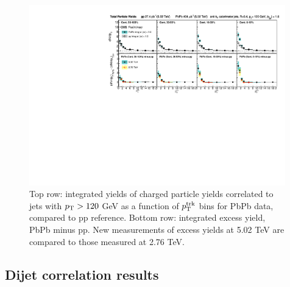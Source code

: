 
  \begin{figure}[hbt]
    \begin{center}
       \includegraphics[width=0.99\textwidth]{figures/results/Integral_dR.pdf}
         \caption[Integrated inclusive jet charged particle yields at 2.76 and 5.02 TeV]{Top row: integrated yields of charged particle yields correlated to jets with $p_{\rm T} > 120$ GeV as a function of $p_{\rm T}^{\rm trk}$ bins for PbPb data, compared to pp reference.  Bottom row:  integrated excess yield, PbPb minus pp. New measurements of excess yields at 5.02 TeV are compared to those measured at 2.76 TeV.}       \label{fig:yield_integral}
    \end{center}
 \end{figure}


\clearpage

\subsection{Dijet correlation results}
\label{sec:dijet_corr}

